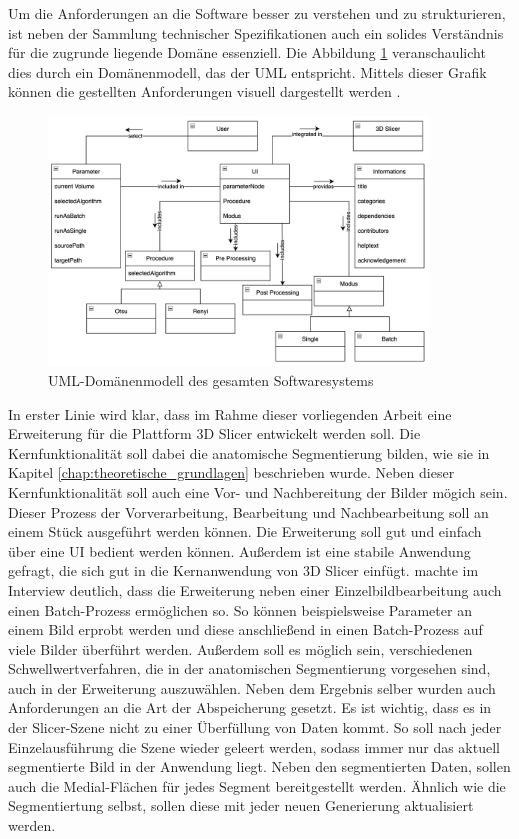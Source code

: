 Um die Anforderungen an die Software besser zu verstehen und zu strukturieren,
ist neben der Sammlung technischer Spezifikationen auch ein solides Verständnis
für die zugrunde liegende Domäne essenziell. Die Abbildung \ref{fig:3d_slicer_domäne}
veranschaulicht dies durch ein Domänenmodell, das der \ac{UML} entspricht.
Mittels dieser Grafik können die gestellten Anforderungen visuell dargestellt
werden \citep[vgl.][]{walter2025}.

\begin{figure}[h]
	\centering
	\includegraphics[width=0.9\textwidth]{img/domaene.png}
	\caption{UML-Domänenmodell des gesamten Softwaresystems}
	\label{fig:3d_slicer_domäne}
\end{figure}

In erster Linie wird klar, dass im Rahme dieser vorliegenden Arbeit eine Erweiterung
für die Plattform 3D Slicer entwickelt werden soll. Die Kernfunktionalität soll
dabei die anatomische Segmentierung bilden, wie sie in Kapitel \ref{chap:theoretische_grundlagen}
beschrieben wurde. Neben dieser Kernfunktionalität soll auch eine Vor- und Nachbereitung
der Bilder mögich sein. Dieser Prozess der Vorverarbeitung, Bearbeitung und Nachbearbeitung
soll an einem Stück ausgeführt werden können. Die Erweiterung soll gut und
einfach über eine \ac{UI} bedient werden können. Außerdem ist eine stabile
Anwendung gefragt, die sich gut in die Kernanwendung von 3D Slicer einfügt.
\citet[]{walter2025} machte im Interview deutlich, dass die Erweiterung neben
einer Einzelbildbearbeitung auch einen Batch-Prozess ermöglichen so. So können beispielsweise
Parameter an einem Bild erprobt werden und diese anschließend in einen Batch-Prozess
auf viele Bilder überführt werden. Außerdem soll es möglich sein, verschiedenen Schwellwertverfahren,
die in der anatomischen Segmentierung vorgesehen sind, auch in der Erweiterung auszuwählen.
Neben dem Ergebnis selber wurden auch Anforderungen an die Art der Abspeicherung
gesetzt. Es ist wichtig, dass es in der Slicer-Szene nicht zu einer Überfüllung
von Daten kommt. So soll nach jeder Einzelausführung die Szene wieder geleert werden,
sodass immer nur das aktuell segmentierte Bild in der Anwendung liegt. Neben den
segmentierten Daten, sollen auch die Medial-Flächen für jedes Segment
bereitgestellt werden. Ähnlich wie die Segmentiertung selbst, sollen diese mit
jeder neuen Generierung aktualisiert werden.

